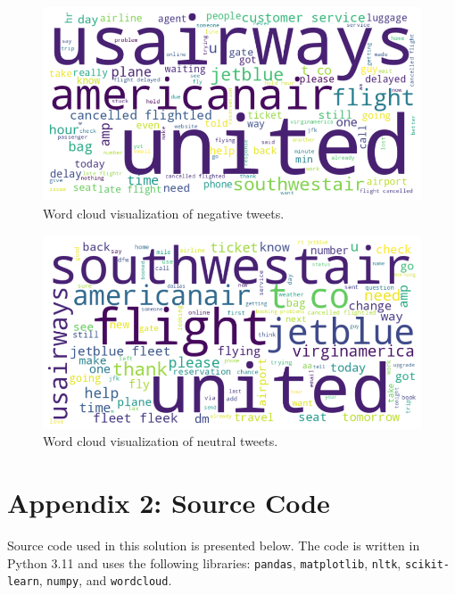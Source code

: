 \documentclass{article}
\begin{document}
\begin{figure}[!htbp]
    \centering
    \includegraphics[width=\textwidth]{data/plots/negative_wordcloud.png}
    \caption{Word cloud visualization of negative tweets.}
    \label{fig:negative_wordcloud}
\end{figure}

\begin{figure}[!htbp]
    \centering
    \includegraphics[width=\textwidth]{data/plots/neutral_wordcloud.png}
    \caption{Word cloud visualization of neutral tweets.}
    \label{fig:neutral_wordcloud}
\end{figure}

\newpage

\section*{Appendix 2: Source Code}

Source code used in this solution is presented below. The code is written in Python 3.11 and uses the following libraries: \texttt{pandas}, \texttt{matplotlib}, \texttt{nltk}, \texttt{scikit-learn}, \texttt{numpy}, and \texttt{wordcloud}.
\end{document}
